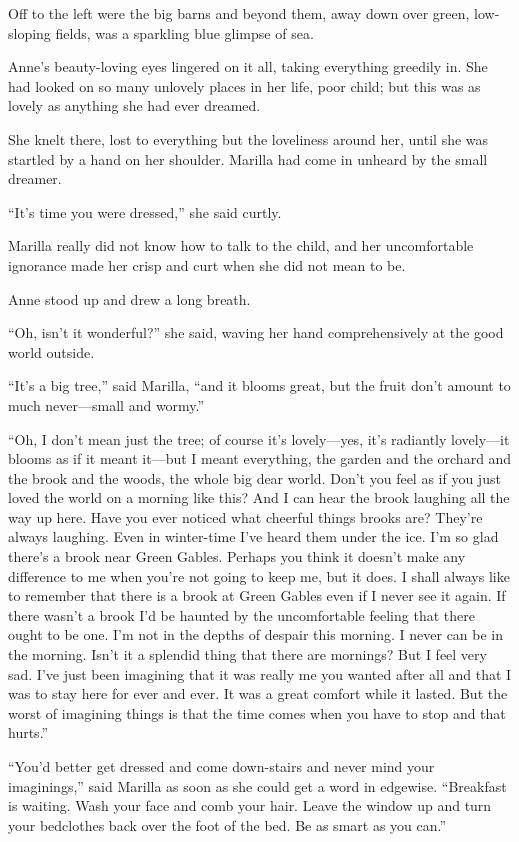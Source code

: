 \documentclass[a4paper]{article}
\begin{document}
\normalsize{Off to the left were the big barns and beyond them, away down over green, low-sloping fields, was a sparkling blue glimpse of sea.}

Anne's beauty-loving eyes lingered on it all, taking everything greedily in. She had looked on so many unlovely places in her life, poor child; but this was as lovely as anything she had ever dreamed.

She knelt there, lost to everything but the loveliness around her, until she was startled by a hand on her shoulder. Marilla had come in unheard by the small dreamer.

\large{``It's time you were dressed,'' she said curtly.}

Marilla really did not know how to talk to the child, and her uncomfortable ignorance made her crisp and curt when she did not mean to be.

Anne stood up and drew a long breath.

\Large{``Oh, isn't it wonderful?'' she said, waving her hand comprehensively at the good world outside.}

``It's a big tree,'' said Marilla, ``and it blooms great, but the fruit don't amount to much never---small and wormy.''

``Oh, I don't mean just the tree; of course it's lovely---yes, it's radiantly lovely---it blooms as if it meant it---but I meant everything, the garden and the orchard and the brook and the woods, the whole big dear world. Don't you feel as if you just loved the world on a morning like this? And I can hear the brook laughing all the way up here. Have you ever noticed what cheerful things brooks are? They're always laughing. Even in winter-time I've heard them under the ice. I'm so glad there's a brook near Green Gables. Perhaps you think it doesn't make any difference to me when you're not going to keep me, but it does. I shall always like to remember that there is a brook at Green Gables even if I never see it again. If there wasn't a brook I'd be haunted by the uncomfortable feeling that there ought to be one. I'm not in the depths of despair this morning. I never can be in the morning. Isn't it a splendid thing that there are mornings? But I feel very sad. I've just been imagining that it was really me you wanted after all and that I was to stay here for ever and ever. It was a great comfort while it lasted. But the worst of imagining things is that the time comes when you have to stop and that hurts.''

\LARGE{``You'd better get dressed and come down-stairs and never mind your imaginings,'' said Marilla as soon as she could get a word in edgewise. ``Breakfast is waiting. Wash your face and comb your hair. Leave the window up and turn your bedclothes back over the foot of the bed. Be as smart as you can.''}
\end{document}
